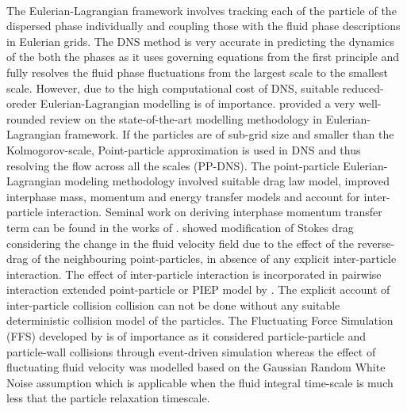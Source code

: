 \documentclass[notitlepage]{revtex4-1}
\begin{document}
\\The Eulerian-Lagrangian framework involves tracking each of the particle of the dispersed phase individually and coupling those with the fluid phase descriptions in Eulerian grids. The DNS method is very accurate in predicting the dynamics of the both the phases as it uses governing equations from the first principle and fully resolves the fluid phase fluctuations from the largest scale to the smallest scale. However, due to the high computational cost of DNS, suitable reduced-oreder Eulerian-Lagrangian modelling is of importance. \citet{subramaniam2018towards} provided a very well-rounded review on the state-of-the-art modelling methodology in Eulerian-Lagrangian framework. If the particles are of sub-grid size and smaller than the Kolmogorov-scale, Point-particle approximation is used in DNS and thus resolving the flow across all the scales (PP-DNS). The point-particle Eulerian-Lagrangian modeling methodology involved suitable drag law model, improved interphase mass, momentum and energy transfer models and account for inter-particle interaction. Seminal work on deriving interphase momentum transfer term can be found in the works of \citep{garg2007accurate,garg2009numerically} .\citet{horwitz2016accurate} showed modification of Stokes drag considering the change in the fluid velocity field due to the effect of the reverse-drag of the neighbouring point-particles, in absence of any explicit inter-particle interaction. The effect of inter-particle interaction is incorporated in pairwise interaction extended point-particle or PIEP model by \citep{akiki2017pairwise}. The explicit account of inter-particle collision collision can not be done without any suitable deterministic collision model of the particles. The Fluctuating Force Simulation (FFS) developed by \citep{goswami2010particle} is of importance as it considered particle-particle and particle-wall collisions through event-driven simulation whereas the effect of fluctuating fluid velocity was modelled based on the Gaussian Random White Noise assumption which is applicable when the fluid integral time-scale is much less that the particle relaxation timescale. 
\end{document}
